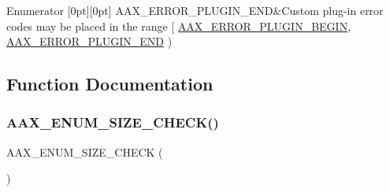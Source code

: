 \begin{DoxyEnumFields}{Enumerator}
[0pt][0pt]{}\mbox{\label{a00494_a5f8c7439f3a706c4f8315a9609811937a2bfce952f1b95322cf4748c115533658}} 
A\+A\+X\+\_\+\+E\+R\+R\+O\+R\+\_\+\+P\+L\+U\+G\+I\+N\+\_\+\+E\+ND&Custom plug-\/in error codes may be placed in the range \mbox{[} \mbox{\hyperlink{a00494_a5f8c7439f3a706c4f8315a9609811937a71083c68ddd0e16973ba85383727ef9e}{A\+A\+X\+\_\+\+E\+R\+R\+O\+R\+\_\+\+P\+L\+U\+G\+I\+N\+\_\+\+B\+E\+G\+IN}}, \mbox{\hyperlink{a00494_a5f8c7439f3a706c4f8315a9609811937a2bfce952f1b95322cf4748c115533658}{A\+A\+X\+\_\+\+E\+R\+R\+O\+R\+\_\+\+P\+L\+U\+G\+I\+N\+\_\+\+E\+ND}} ) \\
\hline

\end{DoxyEnumFields}


\subsection{Function Documentation}
\mbox{\label{a00494_aaba9e3f1468463f7ead56dfdf2cfa773}} 
\subsubsection{\texorpdfstring{AAX\_ENUM\_SIZE\_CHECK()}{AAX\_ENUM\_SIZE\_CHECK()}}
{\footnotesize\ttfamily A\+A\+X\+\_\+\+E\+N\+U\+M\+\_\+\+S\+I\+Z\+E\+\_\+\+C\+H\+E\+CK (\begin{DoxyParamCaption}\item[{\mbox{\hyperlink{a00494_a5f8c7439f3a706c4f8315a9609811937}{A\+A\+X\+\_\+\+E\+Error}}}]{ }\end{DoxyParamCaption})}

